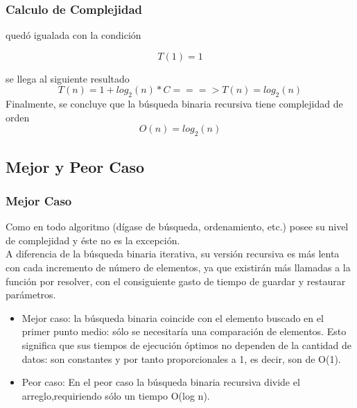 \documentclass{beamer}
\begin{document}
	\begin{frame}
		\frametitle{Calculo de Complejidad}
		
		 quedó igualada con la condición 

	\begin{equation}
		T(1) = 1 
	\end{equation}

	se llega al siguiente resultado
             \begin{equation}
					T(n) = 1 + log_2 {(n)} * C ===> T(n) = log_2 {(n)}
				\end{equation}
		Finalmente, se concluye que la búsqueda binaria recursiva tiene complejidad de orden
				  \begin{equation}
					O(n) = log_2 {(n)}
				\end{equation}		
	\end{frame}



	\subsection{Mejor y Peor Caso}

		\begin{frame}
			\frametitle{Mejor Caso}
			\begin{center}
Como en todo algoritmo (dígase de búsqueda, ordenamiento, etc.) posee su nivel de complejidad y éste no es la excepción.\\
A diferencia de la búsqueda binaria iterativa, su versión recursiva es más lenta con cada incremento de número de elementos, ya que existirán más llamadas a la función por resolver, con el consiguiente gasto de tiempo de guardar y restaurar parámetros.

			\begin{itemize}[<+->]
				\item Mejor caso: la búsqueda binaria coincide con el elemento buscado en el primer punto medio: sólo se necesitaría una comparación de elementos. Esto significa que sus tiempos de ejecución óptimos no dependen de la cantidad de datos: son constantes y por tanto proporcionales a 1, es decir, son de O(1).
				
				\item Peor caso: En el peor caso la búsqueda binaria recursiva divide el arreglo,requiriendo sólo un tiempo O(log n).
			\end{itemize}			 
			\end{center}

		\end{frame}
	
\end{document}
